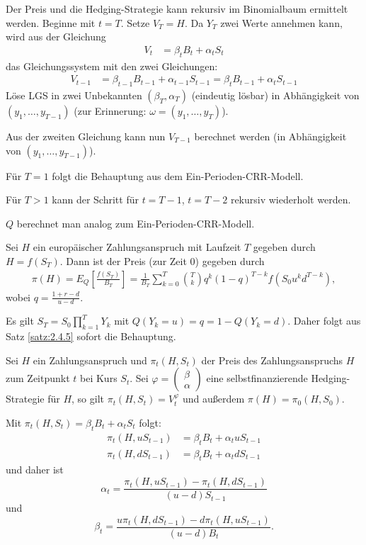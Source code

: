 \documentclass[a4paper,twoside,DIV15,BCOR12mm]{scrbook}
\begin{document}
 \begin{beweis}
 Der Preis und die Hedging-Strategie kann rekursiv im Binomialbaum ermittelt werden. Beginne mit $t=T$. Setze $V_T=H$. Da $Y_T$ zwei Werte annehmen kann, wird aus der Gleichung 
 \begin{align*}
 V_t&= \beta_t B_t+ \alpha_t S_t
 \end{align*}
das Gleichungssystem mit den zwei Gleichungen:
 \begin{align*}
 V_{t-1}&= \beta_{t-1}B_{t-1}+\alpha_{t-1}S_{t-1}=\beta_tB_{t-1}+\alpha_tS_{t-1}
 \end{align*}
 Löse LGS in zwei Unbekannten $(\beta_T, \alpha_T)$ (eindeutig lösbar) in Abhängigkeit von $(y_1,\ldots,y_{T-1})$ (zur Erinnerung: $\omega=(y_1,\ldots,y_T)$).

 Aus der zweiten Gleichung kann nun $V_{T-1}$ berechnet werden (in Abhängigkeit von $(y_1,\ldots, y_{T-1})$).

 Für $T=1$ folgt die Behauptung aus dem Ein-Perioden-CRR-Modell.

 Für $T>1$ kann der Schritt für $t=T-1$, $t=T-2$ rekursiv wiederholt werden. 

 $Q$ berechnet man analog zum Ein-Perioden-CRR-Modell.
 \end{beweis}
 \begin{korollar}
 Sei $H$ ein europäischer Zahlungsanspruch mit Laufzeit $T$ gegeben durch $H=f(S_T)$. Dann ist der Preis (zur Zeit 0) gegeben durch
 \begin{align*}
 \pi(H)=E_Q\left[\frac{f(S_T)}{B_T}\right]=\frac{1}{B_T} \sum\limits_{k=0}^T \binom{T}{k} q^k (1-q)^{T-k} f(S_0u^kd^{T-k}),
 \end{align*}
wobei $q=\frac{1+r-d}{u-d}$.\label{kor:2.4.6}
 \end{korollar}
 \begin{beweis}
 Es gilt $S_T=S_0 \prod\limits_{k=1}^T Y_k$ mit $Q(Y_k=u)=q=1-Q(Y_k=d)$. Daher folgt aus Satz \ref{satz:2.4.5} sofort die Behauptung.
 \end{beweis}
 
\begin{bemerkung}
Sei $H$ ein Zahlungsanspruch und $\pi_t(H,S_t)$ der Preis des Zahlungsanspruchs $H$ zum Zeitpunkt $t$ bei Kurs $S_t$. Sei 
$\varphi=\left(\begin{smallmatrix} \beta \\ \alpha \end{smallmatrix}\right)$ 
eine selbstfinanzierende Hedging-Strategie für $H$, so gilt $\pi_t(H,S_t)=V_t^\varphi$ und außerdem $\pi(H) = \pi_0(H,S_0)$.

Mit $\pi_t(H,S_t) = \beta_t B_t + \alpha_t S_t$ folgt:
\begin{align*}
\pi_t(H,u S_{t-1}) &= \beta_t B_t + \alpha_t u S_{t-1} \\
\pi_t(H,d S_{t-1}) &= \beta_t B_t + \alpha_t d S_{t-1}
\end{align*}
und daher ist
\[
\alpha_t = \frac{\pi_t(H,uS_{t-1}) - \pi_t(H,dS_{t-1})}{(u-d) S_{t-1}}
\]
und
\[
\beta_t = \frac{u\pi_t(H,d S_{t-1}) - d\pi_t(H,uS_{t-1})}{(u-d)B_t}.
\]
\end{bemerkung}
\end{document}
